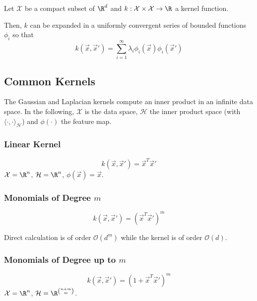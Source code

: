 \begin{theorem}
    Let $\mathcal{X}$ be a compact subset of
    $\R^d$ and
    $k : \mathcal{X} \times \mathcal{X} \to \R$
    a kernel function.
    
    Then, $k$ can be expanded in a uniformly convergent
    series of bounded functions $\phi_i$ so that
    \begin{equation*}
        k(\vec{x}, \vec{x}') =
        \sum_{i=1}^{\infty}{
            \lambda_i \phi_i(\vec{x}) \phi_i(\vec{x}')
        }
    \end{equation*}
\end{theorem}


\subsection{Common Kernels}
The Gaussian and Laplacian kernels compute an inner product
in an infinite data space.
In the following, $\mathcal{X}$ is the data space,
$\mathcal{H}$ the inner product space
(with $\langle \cdot , \cdot \rangle_\mathcal{H}$)
and $\phi(\cdot)$ the feature map.

\subsubsection{Linear Kernel}
\begin{equation*}
    k(\vec{x}, \vec{x}') = \vec{x}^T \vec{x}'
\end{equation*}
$\mathcal{X} = \R^n$,
$\mathcal{H} = \R^n$,
$\phi(\vec{x}) = \vec{x}$.

\subsubsection{Monomials of Degree $m$}
\begin{equation*}
    k(\vec{x}, \vec{x}') = (\vec{x}^T \vec{x}')^m
\end{equation*}

Direct calculation is of order $\mathcal{O}(d^m)$
while the kernel is of order $\mathcal{O}(d)$.

\subsubsection{Monomials of Degree up to $m$}
\begin{equation*}
    k(\vec{x}, \vec{x}') = (1 + \vec{x}^T \vec{x}')^m
\end{equation*}
$\mathcal{X} = \R^n$,
$\mathcal{H} = \R^{\binom{n+m}{m}}$.

